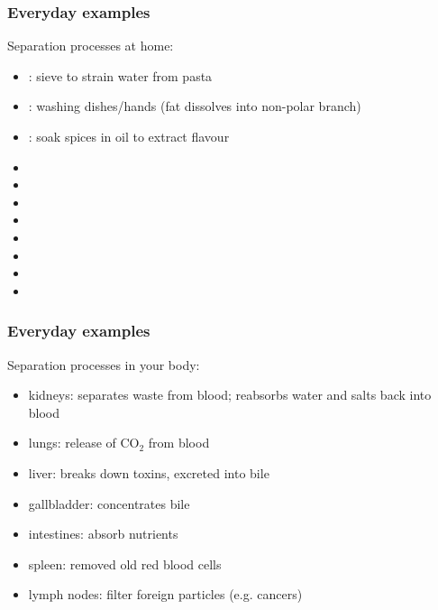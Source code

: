\begin{frame}\frametitle{Everyday examples}
	Separation processes at home:
	\begin{itemize}
		\item	{\color{myGreen}{screening}}: sieve to strain water from pasta
		\item	{\color{myGreen}{absorption}}: washing dishes/hands {\scriptsize (fat dissolves into non-polar branch)}
		\item	{\color{myGreen}{liquid/liquid extraction}}: soak spices in oil to extract flavour 
		\pause
		\item	\iftoggle{instructor}{\href{https://www.youtube.com/watch?v=QpXQpRYxUCY.mp4}{{\color{myGreen}{cyclone:}} vacuum cleaner}}{\href{https://www.youtube.com/watch?v=QpXQpRYxUCY.mp4}{cyclone:}}
		\item	\iftoggle{instructor}{{\color{myGreen}{filtering}}: vacuum cleaner; furnace filter}{{\color{myGreen}{filter}}:}		
		\item	\iftoggle{instructor}{{\color{myGreen}{leaching}}: coffee/espresso maker}{{\color{myGreen}{leaching}}:} %
		\item	\iftoggle{instructor}{{\color{myGreen}{leaching}}: making tea}{{\color{myGreen}{leaching}}:}
		\item	\iftoggle{instructor}{{\color{myGreen}{adsorption}}: water filter}{{\color{myGreen}{adsorption}}:}
		\item	\iftoggle{instructor}{{\color{myGreen}{centrifugation}}: clothes washing machine}{{\color{myGreen}{centrifugation}}:}
		\item	\iftoggle{instructor}{{\color{myGreen}{phase change by heat addition}}: clothes drier}{{\color{myGreen}{phase change by heat addition}}:}
		\item	\iftoggle{instructor}{{\color{myGreen}{phase change by heat removal}}: dehumidifier}{{\color{myGreen}{phase change by heat removal}}:}
	\end{itemize}
\end{frame}
	
\begin{frame}\frametitle{Everyday examples}
	Separation processes in your body:
	\begin{itemize}
		\item	kidneys: separates waste from blood; reabsorbs water and salts back into blood
		\item	lungs: release of $\text{CO}_2$ from blood
		\item	liver: breaks down toxins, excreted into bile
		\item	gallbladder: concentrates bile
		\item	intestines: absorb nutrients
		\item	spleen: removed old red blood cells
		\item	lymph nodes: filter foreign particles (e.g. cancers)
	\end{itemize}
\end{frame}

